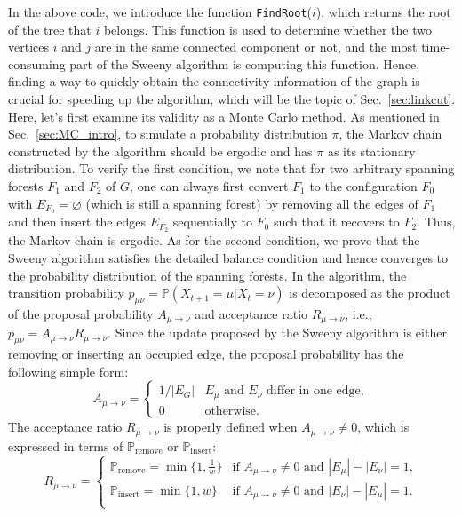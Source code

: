 In the above code, we introduce the function \texttt{FindRoot}($i$), which returns the root of the tree that $i$ belongs.
This function is used to determine whether the two vertices $i$ and $j$ are in the same connected component or not, and
the most time-consuming part of the Sweeny algorithm is computing this function. Hence, finding a way to quickly
obtain the connectivity information of the graph is crucial for speeding up the algorithm, which will be the
topic of Sec.~\ref{sec:linkcut}. Here, let's first examine its validity as a Monte Carlo method. As mentioned in Sec.~\ref{sec:MC_intro},
to simulate a probability distribution $\pi$, the Markov chain constructed by the algorithm should be ergodic
and has $\pi$ as its stationary distribution. To verify the first condition, we note that for two arbitrary spanning forests
$F_1$ and $F_2$ of $G$, one can always first convert $F_1$ to the configuration $F_0$ with $E_{F_0} = \varnothing$ (which is
still a spanning forest) by removing all the edges of $F_1$ and then insert the edges $E_{F_2}$ sequentially to $F_0$ 
such that it recovers to $F_2$. Thus, the Markov chain is ergodic. As for the second condition, we prove that the Sweeny algorithm satisfies the detailed
balance condition and hence converges to the probability distribution of the spanning forests. In the algorithm, the transition 
probability $p_{\mu \nu} = \mathbb{P}(X_{t+1} = \mu|X_t = \nu)$ is decomposed as the product of the proposal probability $A_{\mu\to\nu}$ and acceptance
ratio $R_{\mu\to\nu}$, i.e., $p_{\mu \nu} = A_{\mu\to\nu}R_{\mu\to \nu}$. Since the update proposed by the Sweeny algorithm is either
removing or inserting an occupied edge, the proposal probability has the following simple form:
\begin{equation}\label{eq:proposal_prob}
  A_{\mu \to \nu} = 
  \begin{cases}
    1/|E_G|  & E_{\mu} \text{ and } E_{\nu} \text{ differ in one edge}, \\
    0        & \text{otherwise}.
  \end{cases}
\end{equation}
The acceptance ratio $R_{\mu \to \nu}$ is properly defined when $A_{\mu \to \nu} \neq 0$, which is expressed in terms of $\mathbb{P}_{\text{remove}}$ or $\mathbb{P}_{\text{insert}}$:
\begin{equation}\label{eq:acc_ratio}
  R_{\mu \to \nu} = 
  \begin{cases}
    \mathbb{P}_{\text{remove}} = \min\{1, \frac{1}{w}\} & \text{if } A_{\mu\to\nu} \neq 0 \text{ and } |E_\mu| - |E_\nu| = 1,\\
    \mathbb{P}_{\text{insert}} = \min\{1, w\}& \text{if } A_{\mu\to\nu} \neq 0 \text{ and } |E_\nu| - |E_\mu| = 1.\\
  \end{cases}
\end{equation}
